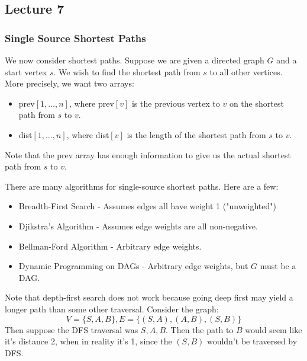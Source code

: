\subsection{Lecture 7}

\subsubsection{Single Source Shortest Paths}

We now consider shortest paths. Suppose we are given
a directed graph $G$ and a start vertex $s$. We wish to find the shortest path from $s$ to all other vertices. More precisely,
we want two arrays:
\begin{itemize}
    \item prev$[1, \dots, n]$, where prev$[v]$ is the previous vertex to $v$ on the shortest path from $s$ to $v$.
    \item dist$[1, \dots, n]$, where dist$[v]$ is the length of the shortest path from $s$ to $v$.
\end{itemize}

Note that the prev array has enough information to give us the actual shortest path from $s$ to $v$.

There are many algorithms for single-source shortest paths. Here are a few:

\begin{itemize}
    \item Breadth-First Search - Assumes edges all have weight 1 ("unweighted")
    \item Djikstra's Algorithm - Assumes edge weights are all non-negative.
    \item Bellman-Ford Algorithm - Arbitrary edge weights.
    \item Dynamic Programming on DAGs - Arbitrary edge weights, but $G$ must be a DAG.
\end{itemize}

Note that depth-first search does not work because going deep first may yield a longer path than some other traversal. Consider the graph:
\[ V = \{S, A, B \}, E = \{(S, A), (A, B), (S, B)\} \]
Then suppose the DFS traversal was $S, A, B$. Then the path to $B$ would seem like it's distance 2, when in reality it's 1, since the $(S,B)$ wouldn't be traversed by DFS.

